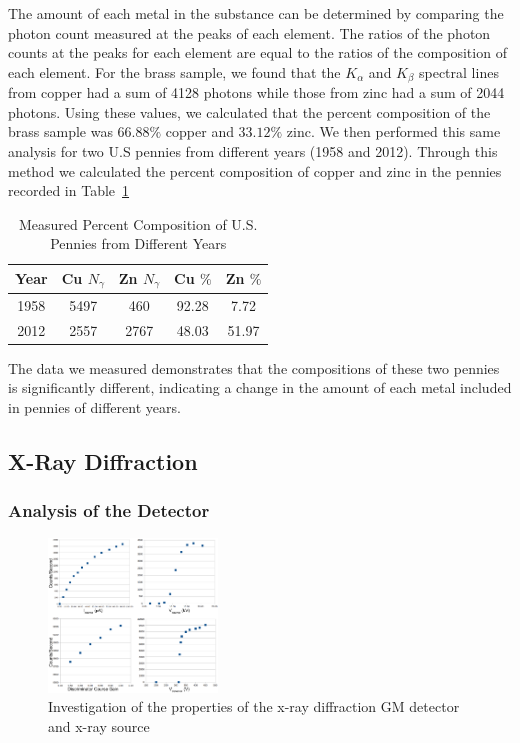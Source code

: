 \documentclass[%
 reprint,
 amsmath,amssymb,
 aps,
 pra,
]{revtex4-1}
\begin{document}
The amount of each metal in the substance can be determined by comparing the photon count measured at the peaks of each element. The ratios of the photon counts at the peaks for each element are equal to the ratios of the composition of each element. For the brass sample, we found that the $K_{\alpha}$ and $K_{\beta}$ spectral lines from copper had a sum of 4128 photons while those from zinc had a sum of 2044 photons. Using these values, we calculated that the percent composition of the brass sample was $66.88 \%$ copper and $33.12 \%$ zinc. We then performed this same analysis for two U.S pennies from different years (1958 and 2012). Through this method we calculated the percent composition of copper and zinc in the pennies recorded in Table~\ref{Tab:Pennies}

\begin{table}[htbp]
	\begin{center}
		\begin{tabular}{|c|c|c|c|c|}
			\hline Year & Cu $N_{\gamma}$ & Zn $N_{\gamma}$ & Cu $\%$ & Zn $\%$ \\
			\hline 1958 & 5497 & 460 & 92.28 & 7.72 \\
			\hline 2012 & 2557 & 2767 & 48.03 & 51.97 \\
			\hline
		\end{tabular}
	\end{center}
	\caption{Measured Percent Composition of U.S. Pennies from Different Years}
	\label{Tab:Pennies}
\end{table}

The data we measured demonstrates that the compositions of these two pennies is significantly different, indicating a change in the amount of each metal included in pennies of different years.

\subsection{X-Ray Diffraction}

\subsubsection{Analysis of the Detector}

\begin{figure}[H]
	\centering
	\includegraphics[width=0.4\textwidth]{xrd_setup_investigation.png}
	\caption{Investigation of the properties of the x-ray diffraction GM detector and x-ray source}
	\label{fig:xrf_setup_investigation}
\end{figure}
\end{document}

